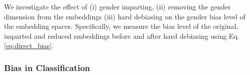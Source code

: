 \documentclass[11pt,a4paper]{article}
\begin{document}


We investigate the effect of (i) gender imparting, (ii) 
removing the gender dimension from the embeddings (iii) hard debiasing
\citep{bolukbasi16debiasing} on the gender bias level of the embedding spaces. Specifically, we measure the bias level of the original, imparted and reduced embeddings before and after hard debiasing using Eq. \ref{eq:direct_bias}.


\subsubsection{Bias in Classification}
\end{document}
